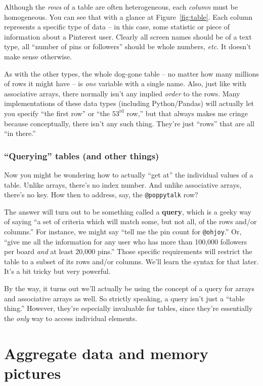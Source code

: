 Although the \textit{rows} of a table are often heterogeneous, each
\textit{column} must be homogeneous. You can see that with a glance at
Figure~\ref{fig:table}. Each column represents a specific type of data -- in
this case, some statistic or piece of information about a Pinterest user.
Clearly all screen names should be of a text type, all ``number of pins or
followers'' should be whole numbers, \textit{etc.} It doesn't make sense
otherwise.

As with the other types, the whole dog-gone table -- no matter how many
millions of rows it might have -- is \textit{one} variable with a single name.
Also, just like with associative arrays, there normally isn't any implied
\textit{order} to the rows. Many implementations of these data types (including
Python/Pandas) will actually let you specify ``the first row'' or ``the
$53^{\textrm{rd}}$ row,'' but that always makes me cringe because conceptually,
there isn't any such thing. They're just ``rows'' that are all ``in
there.''

\subsubsection{``Querying'' tables (and other things)}
Now you might be wondering how to actually ``get at'' the individual values of
a table. Unlike arrays, there's no index number. And unlike associative arrays,
there's no key. How then to address, say, the \texttt{@poppytalk} row?

The answer will turn out to be something called a \textbf{query}, which is a
geeky way of saying ``a set of criteria which will match some, but not all, of
the rows and/or columns.'' For instance, we might say ``tell me the pin count
for \texttt{@ohjoy}.'' Or, ``give me all the information for any user who has
more than 100,000 followers per board \textit{and} at least 20,000 pins.''
Those specific requirements will restrict the table to a subset of its rows
and/or columns. We'll learn the syntax for that later. It's a bit tricky but
very powerful.

By the way, it turns out we'll actually be using the concept of a query for
arrays and associative arrays as well. So strictly speaking, a query isn't just
a ``table thing.'' However, they're especially invaluable for tables, since
they're essentially the \textit{only} way to access individual elements.

\section{Aggregate data and memory pictures}

